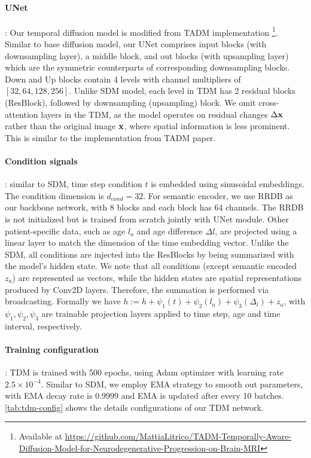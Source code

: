 \paragraph{UNet}: Our temporal diffusion model is modified from TADM implementation \cite{litricoTADMTemporallyAwareDiffusion2024} \footnote{Available at \href{https://github.com/MattiaLitrico/TADM-Temporally-Aware-Diffusion-Model-for-Neurodegenerative-Progression-on-Brain-MRI}{https://github.com/MattiaLitrico/TADM-Temporally-Aware-Diffusion-Model-for-Neurodegenerative-Progression-on-Brain-MRI}}. Similar to base diffusion model, our UNet comprises input blocks (with downsampling layer), a middle block, and out blocks (with upsampling layer) which are the symmetric counterparts of corresponding downsampling blocks. Down and Up blocks contain 4 levels with channel multipliers of $[32, 64, 128, 256]$. Unlike SDM model, each level in TDM has 2 residual blocks (ResBlock), followed by downsampling (upsampling) block. We omit cross-attention layers in the TDM, as the model operates on residual changes $\Delta {\mathbf{x}}$ rather than the original image ${\mathbf{x}}$, where spatial information is less prominent. This is similar to the implementation from TADM paper. 
\paragraph{Condition signals}: similar to SDM, time step condition $t$ is embedded using sinusoidal embeddings. The condition dimension is $d_{cond} = 32$. For semantic encoder, we use RRDB \cite{zhang2018RRDB} as our backbone network, with 8 blocks and each block has 64 channels. The RRDB is not initialized but is trained from scratch jointly with UNet module. Other patient-specific data, such as age $l_a$ and age difference $\Delta l$, are projected using a linear layer to match the dimension of the time embedding vector. Unlike the SDM, all conditions are injected into the ResBlocks by being summarized with the model’s hidden state. We note that all conditions (except semantic encoded $z_a$) are represented as vectors, while the hidden states are spatial representations produced by Conv2D layers. Therefore, the summation is performed via broadcasting. Formally we have $h := h + \psi_1(t) + \psi_2(l_a) + \psi_3(\Delta_l) + z_{a}$, with $\psi_1, \psi_2, \psi_3$ are trainable projection layers applied to time step, age and time interval, respectively. 
\paragraph{Training configuration}: TDM is trained with 500 epochs, using Adam optimizer with learning rate $2.5 \times 10^{-4}$. Similar to SDM, we employ EMA strategy to smooth out parameters, with EMA decay rate is $0.9999$ and EMA is updated after every 10 batches. \cref{tab:tdm-config} shows the details configurations of our TDM network.

